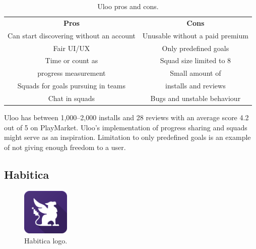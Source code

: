 \begin{table}[h!]
    \centering
    \begin{adjustbox}{width=\textwidth}
        \begin{ctucolortab}
            \begin{tabular}{cc}
                \bfseries Pros & \bfseries Cons\\\Midrule
                Can start discovering without an account & Unusable without a paid premium\\
                Fair UI/UX & Only predefined goals\\
                Time or count as & Squad size limited to 8\\
                progress measurement & Small amount of \\
                Squads for goals pursuing in teams & installs and reviews\\
                Chat in squads & Bugs and unstable behaviour\\
            \end{tabular}
        \end{ctucolortab}
    \end{adjustbox}
    \caption{Uloo pros and cons.}\label{tab:uloo-pros-cons}
\end{table}

Uloo has between 1,000--2,000 installs and 28 reviews with an average score 4.2 out of 5 on PlayMarket.
Uloo's implementation of progress sharing and squads might serve as an inspiration.
Limitation to only predefined goals is an example of not giving enough freedom to a user.


\subsection{Habitica}\label{subsec:habitica}

\begin{figure}[h!]
    \includegraphics[width=0.20\textwidth]{images/habitica-logo.png}
    \caption{Habitica logo.\cite{habitica-logo}}
    \label{fig:habitica-logo}
\end{figure}

